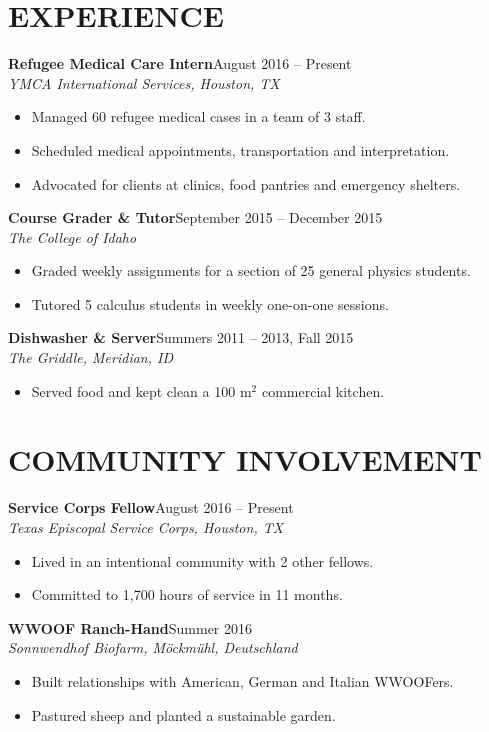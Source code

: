 \documentclass[margin]{res}
\newcommand\job[3]{\textbf{#1}\hfill {#2}\\ \emph{#3} }
\newenvironment{details}{\begin{itemize}[itemsep=0.6pt,topsep=2.2pt] }{\end{itemize} }
\begin{document}
\begin{resume}
\section{EXPERIENCE}
	\job{Refugee Medical Care Intern}{August 2016 -- Present}{YMCA International Services, Houston, TX}
    	\begin{details}
	  		\item Managed 60 refugee medical cases in a team of 3 staff.
            \item Scheduled medical appointments, transportation and interpretation.
            \item Advocated for clients at clinics, food pantries and emergency shelters. 
		\end{details}
    \job{Course Grader \& Tutor}{September 2015 -- December 2015}{The College of Idaho}
     	\begin{details}
        	\item Graded weekly assignments for a section of 25 general physics students.
            \item Tutored 5 calculus students in weekly one-on-one sessions.
        \end{details}      
	\job{Dishwasher \& Server}{Summers 2011 -- 2013, Fall 2015}{The Griddle, Meridian, ID}
        \begin{details}
        	\item Served food and kept clean a 100 $\mathrm{m}^2$ commercial kitchen.
        \end{details}    
   
\section{COMMUNITY INVOLVEMENT}
	\job{Service Corps Fellow}{August 2016 -- Present}{Texas Episcopal Service Corps, Houston, TX}
        \begin{details}
            \item Lived in an intentional community with 2 other fellows.
            \item Committed to 1,700 hours of service in 11 months.
        \end{details}   
	\job{WWOOF Ranch-Hand}{Summer 2016}{Sonnwendhof Biofarm, M\"{o}ckm\"{u}hl, Deutschland}
    	\begin{details}
    		\item Built relationships with American, German and Italian WWOOFers.
            \item Pastured sheep and planted a sustainable garden.
     	\end{details}
           

\end{resume}
\end{document}
